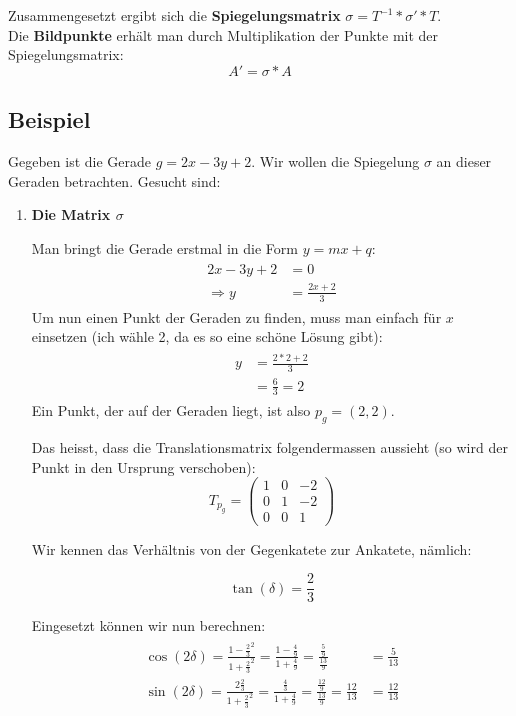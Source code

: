 Zusammengesetzt ergibt sich die \textbf{Spiegelungsmatrix} $\sigma = T^{-1}*\sigma'*T$.\\

Die \textbf{Bildpunkte} erhält man durch Multiplikation der Punkte mit der Spiegelungsmatrix:
\[
A' = \sigma * A
\]

\subsection{Beispiel}
Gegeben ist die Gerade $g = 2x - 3y + 2$. Wir wollen die Spiegelung $\sigma$ an dieser Geraden betrachten. Gesucht sind:

\begin{enumerate}
\item \textbf{Die Matrix $\sigma$}

Man bringt die Gerade erstmal in die Form $y = mx + q$:
\begin{align}
\begin{split}
2x - 3y + 2 &= 0\\
\Rightarrow y &= \frac{2x + 2}{3}
\end{split}
\end{align}
Um nun einen Punkt der Geraden zu finden, muss man einfach für $x$ einsetzen (ich wähle 2, da es so eine schöne Lösung gibt):
\begin{align}
\begin{split}
y &= \frac{2*2 + 2}{3}\\
&=  \frac{6}{3} = 2
\end{split}
\end{align}
Ein Punkt, der auf der Geraden liegt, ist also $p_g = (2,2)$.

Das heisst, dass die Translationsmatrix folgendermassen aussieht (so wird der Punkt in den Ursprung verschoben):
\[
T_{p_g} = \begin{pmatrix}
1 & 0 & -2\\
0 & 1 & -2\\
0 & 0 & 1
\end{pmatrix}
\]

Wir kennen das Verhältnis von der Gegenkatete zur Ankatete, nämlich: 

\[
\tan (\delta) = \frac{2}{3}
\]

Eingesetzt können wir nun berechnen:
\begin{align}
\begin{split}
\cos (2\delta) = \frac{1-\frac{2}{3}^2}{1+\frac{2}{3}^2} = \frac{1-\frac{4}{9}}{1+\frac{4}{9}} = \frac{\frac{5}{9}}{\frac{13}{9}} &= \frac{5}{13}\\
\sin (2\delta) = \frac{2\frac{2}{3}}{1+\frac{2}{3}^2} = \frac{\frac{4}{3}}{1+\frac{4}{9}} = \frac{\frac{12}{9}}{\frac{13}{9}} = \frac{12}{13} &= \frac{12}{13}\\
\end{split}
\end{align}


\end{enumerate}
